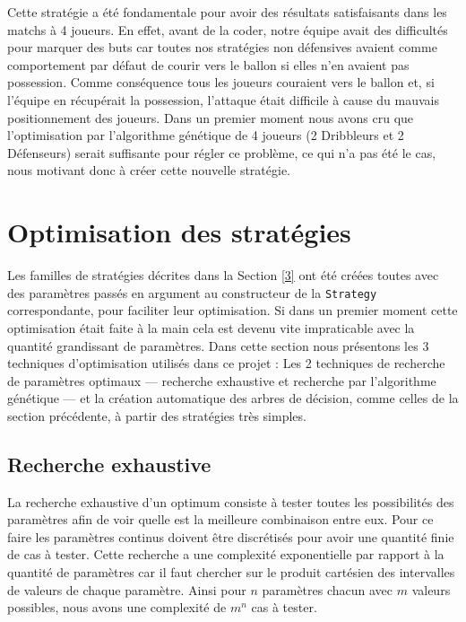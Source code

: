 \documentclass[a4paper,12pt]{article}
\begin{document}
Cette stratégie a été fondamentale pour avoir des résultats satisfaisants dans les matchs à 4 joueurs. En effet, avant de la coder, notre équipe avait des difficultés pour marquer des buts car toutes nos stratégies non défensives avaient comme comportement par défaut de courir vers le ballon si elles n'en avaient pas possession. Comme conséquence tous les joueurs couraient vers le ballon et, si l'équipe en récupérait la possession, l'attaque était difficile à cause du mauvais positionnement des joueurs. Dans un premier moment nous avons cru que l'optimisation par l'algorithme génétique de 4 joueurs (2 Dribbleurs et 2 Défenseurs) serait suffisante pour régler ce problème, ce qui n'a pas été le cas, nous motivant donc à créer cette nouvelle stratégie.

\section{Optimisation des stratégies}
\label{4}

Les familles de stratégies décrites dans la Section \ref{3} ont été créées toutes avec des paramètres passés en argument au constructeur de la \texttt{Strategy} correspondante, pour faciliter leur optimisation. Si dans un premier moment cette optimisation était faite à la main cela est devenu vite impraticable avec la quantité grandissant de paramètres. Dans cette section nous présentons les 3 techniques d'optimisation utilisés dans ce projet : Les 2 techniques de recherche de paramètres optimaux --- recherche exhaustive et recherche par l'algorithme génétique --- et la création automatique des arbres de décision, comme celles de la section précédente, à partir des stratégies très simples.  

\subsection{Recherche exhaustive}

La recherche exhaustive d'un optimum consiste à tester toutes les possibilités des paramètres afin de voir quelle est la meilleure combinaison entre eux. Pour ce faire les paramètres continus doivent être discrétisés pour avoir une quantité finie de cas à tester. Cette recherche a une complexité exponentielle par rapport à la quantité de paramètres car il faut chercher sur le produit cartésien des intervalles de valeurs de chaque paramètre. Ainsi pour $n$ paramètres chacun avec $m$ valeurs possibles, nous avons une complexité de $m^n$ cas à tester. 
\end{document}
